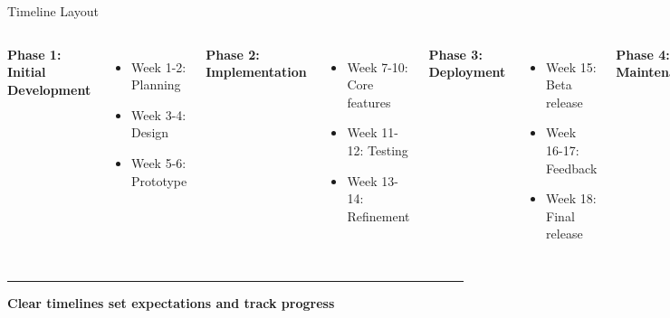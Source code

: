 \documentclass[8pt,aspectratio=169]{beamer}
\newcommand{\bottomnote}[1]{%
\vfill
\vspace{-2mm}
\textcolor{mllavender2}{\rule{\textwidth}{0.4pt}}
\vspace{1mm}
\footnotesize
\textbf{#1}
}
\begin{document}
\begin{frame}[t]{Timeline Layout}
\begin{columns}[T]
\textbf{Phase 1: Initial Development}
\begin{itemize}
\item Week 1-2: Planning
\item Week 3-4: Design
\item Week 5-6: Prototype
\end{itemize}

\vspace{0.5em}
\textbf{Phase 2: Implementation}
\begin{itemize}
\item Week 7-10: Core features
\item Week 11-12: Testing
\item Week 13-14: Refinement
\end{itemize}

\textbf{Phase 3: Deployment}
\begin{itemize}
\item Week 15: Beta release
\item Week 16-17: Feedback
\item Week 18: Final release
\end{itemize}

\vspace{0.5em}
\textbf{Phase 4: Maintenance}
\begin{itemize}
\item Ongoing: Updates
\item Monthly: Reviews
\item Quarterly: Major updates
\end{itemize}
\end{columns}

\vspace{0.5em}
\begin{center}
\framebox[0.95\textwidth][c]{
\vspace{2cm}
\textcolor{midgray}{[Timeline/Gantt Chart Placeholder]}
\vspace{2cm}
}
\end{center}

\bottomnote{Clear timelines set expectations and track progress}
\end{frame}
\end{document}
